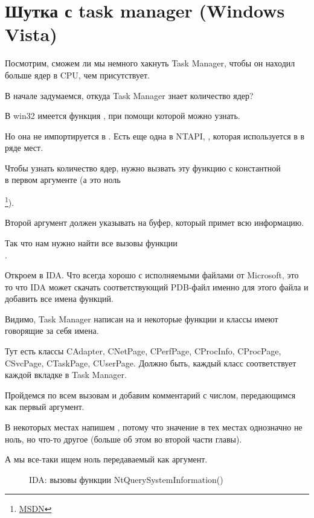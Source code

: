 ﻿\section{Шутка с task manager (Windows Vista)}

Посмотрим, сможем ли мы немного хакнуть Task Manager, чтобы он находил больше ядер в \ac{CPU}, чем присутствует.

В начале задумаемся, откуда Task Manager знает количество ядер?

В win32 имеется функция , при помощи которой можно узнать.

Но она не импортируется в .
Есть еще одна в \gls{NTAPI}, , которая используется в 
 в ряде мест.

Чтобы узнать количество ядер, нужно вызвать эту функцию с константной \\
 в первом аргументе (а это ноль

\footnote{\href{http://go.yurichev.com/17251}{MSDN}}).

Второй аргумент должен указывать на буфер, который примет всю информацию.

Так что нам нужно найти все вызовы функции \\
.

Откроем  в IDA. 
Что всегда хорошо с исполняемыми файлами от Microsoft, это то что IDA может скачать соответствующий 
\gls{PDB}-файл именно для этого файла и добавить все имена функций.

Видимо, Task Manager написан на \Cpp и некоторые функции и классы имеют говорящие за себя имена.

Тут есть классы CAdapter, CNetPage, CPerfPage, CProcInfo, CProcPage, CSvcPage, 
CTaskPage, CUserPage.
Должно быть, каждый класс соответствует каждой вкладке в Task Manager.

Пройдемся по всем вызовам и добавим комментарий с числом, передающимся как первый аргумент.

В некоторых местах напишем , потому что значение в тех местах однозначно не ноль, 
но что-то другое (больше об этом во второй части главы).%

А мы все-таки ищем ноль передаваемый как аргумент.

\begin{figure}[H]
\centering
{}
\caption{IDA: вызовы функции NtQuerySystemInformation()}
\end{figure}

